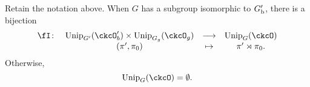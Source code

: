 \documentclass[counting_main.tex]{subfiles}
\begin{document}

\begin{thm}\label{reduction}
  Retain the notation above.
  When $G$ has a subgroup isomorphic to $G'_{\mathrm b}$,
  there is a bijection
  \begin{equation}\label{eq:IND}
      \begin{array}{rccc}
    \fI\colon &   \Unip_{G'}(\ckcO'_{b})\times \Unip_{G_{g}}(\ckcO_{g})&         \longrightarrow &\Unip_{G}(\ckcO) \\
     &   (\pi',\pi_{0}) & \mapsto & \pi'\rtimes \pi_{0}.
      \end{array}
    \end{equation}
    Otherwise,
    \[
    \Unip_{G}(\ckcO)=\emptyset.
    \]
  \end{thm}
\end{document}
